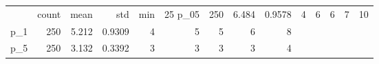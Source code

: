 \begin{tabular}{lrrrrrrrr}
\toprule
 & count & mean & std & min & 25%
\midrule
p_05 & 250 & 6.484 & 0.9578 & 4 & 6 & 6 & 7 & 10 \\
p_1 & 250 & 5.212 & 0.9309 & 4 & 5 & 5 & 6 & 8 \\
p_5 & 250 & 3.132 & 0.3392 & 3 & 3 & 3 & 3 & 4 \\
\bottomrule
\end{tabular}
